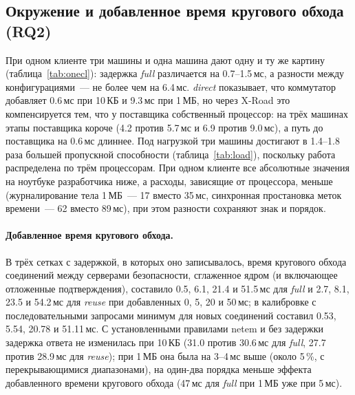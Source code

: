 \documentclass[conference,a4paper]{IEEEtran}
\newcommand{\newtext}[1]{{\color{blue}#1}}
\begin{document}
\subsection{Окружение и добавленное время кругового обхода \newtext{(RQ2)}}\label{sec:rtt}

При одном клиенте три машины и одна машина дают одну и ту же картину (таблица~\ref{tab:onecl}):
задержка \emph{full} различается на 0.7--1.5\,мс, а разности между конфигурациями~--- не более чем на
6.4\,мс.
\emph{direct} показывает, что коммутатор добавляет 0.6\,мс при 10\,КБ и 9.3\,мс при 1\,МБ, но через X-Road
это компенсируется тем, что у поставщика собственный процессор: на трёх машинах этапы поставщика
короче (4.2 против 5.7\,мс и 6.9 против 9.0\,мс), а путь до поставщика на 0.6\,мс длиннее.
Под нагрузкой три машины достигают в 1.4--1.8 раза большей пропускной способности (таблица~\ref{tab:load}), поскольку
работа распределена по трём процессорам. При одном клиенте все абсолютные значения на ноутбуке разработчика ниже, а
расходы, зависящие от процессора, меньше (журналирование тела 1\,МБ~--- 17 вместо 35\,мс, синхронная простановка меток времени~--- 62
вместо 89\,мс), при этом разности сохраняют знак и порядок.

\paragraph{Добавленное время кругового обхода.} В трёх сетках с задержкой, в которых оно записывалось,
время кругового обхода соединений между серверами безопасности, сглаженное ядром (и
включающее отложенные подтверждения), составило 0.5, 6.1, 21.4 и 51.5\,мс для \emph{full} и 2.7, 8.1,
23.5 и 54.2\,мс для \emph{reuse} при добавленных 0, 5, 20 и 50\,мс; в калибровке с последовательными
запросами минимум для новых соединений составил 0.53, 5.54, 20.78 и 51.11\,мс. С установленными правилами netem и без задержки задержка ответа не изменилась при
10\,КБ (31.0 против 30.6\,мс для \emph{full}, 27.7 против 28.9\,мс для \emph{reuse}); при 1\,МБ она
была на 3--4\,мс выше (около 5\,\%, с перекрывающимися диапазонами), на один-два порядка меньше
эффекта добавленного времени кругового обхода (47\,мс для \emph{full} при 1\,МБ уже при 5\,мс).
\end{document}
